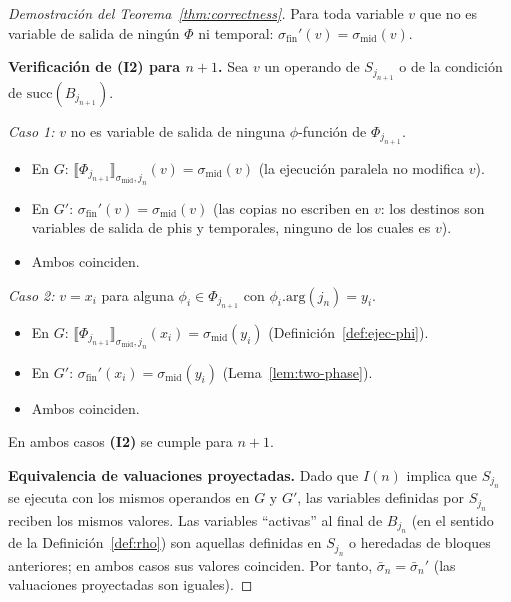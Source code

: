 \documentclass[12pt, a4paper]{article}
\begin{document}
\begin{proof}[Demostración del Teorema~\ref{thm:correctness}]
Para toda variable $v$ que no es variable de salida de ningún $\Phi$ ni temporal:
$\sigma_{\mathrm{fin}}'(v) = \sigma_{\mathrm{mid}}(v)$.

\medskip
%
%
\textbf{Verificación de \textbf{(I2)} para $n+1$.}
Sea $v$ un operando de $S_{j_{n+1}}$ o de la condición de $\mathrm{succ}(B_{j_{n+1}})$.

\emph{Caso 1:} $v$ no es variable de salida de ninguna $\phi$-función de $\Phi_{j_{n+1}}$.
\begin{itemize}
  \item En $G$: $\llbracket \Phi_{j_{n+1}} \rrbracket_{\sigma_{\mathrm{mid}}, j_n}(v)
    = \sigma_{\mathrm{mid}}(v)$ \quad (la ejecución paralela no modifica $v$).
  \item En $G'$: $\sigma_{\mathrm{fin}}'(v) = \sigma_{\mathrm{mid}}(v)$ \quad
    (las copias no escriben en $v$: los destinos son variables de salida de phis y temporales,
    ninguno de los cuales es $v$).
  \item Ambos coinciden. \checkmark
\end{itemize}

\emph{Caso 2:} $v = x_i$ para alguna $\phi_i \in \Phi_{j_{n+1}}$ con
$\phi_i.\mathrm{arg}(j_n) = y_i$.
\begin{itemize}
  \item En $G$: $\llbracket \Phi_{j_{n+1}} \rrbracket_{\sigma_{\mathrm{mid}}, j_n}(x_i)
    = \sigma_{\mathrm{mid}}(y_i)$ \quad (Definición~\ref{def:ejec-phi}).
  \item En $G'$: $\sigma_{\mathrm{fin}}'(x_i) = \sigma_{\mathrm{mid}}(y_i)$ \quad
    (Lema~\ref{lem:two-phase}).
  \item Ambos coinciden. \checkmark
\end{itemize}

\medskip
En ambos casos \textbf{(I2)} se cumple para $n+1$.

\medskip
\textbf{Equivalencia de valuaciones proyectadas.}
Dado que $I(n)$ implica que $S_{j_n}$ se ejecuta con los mismos operandos en $G$ y $G'$,
las variables definidas por $S_{j_n}$ reciben los mismos valores. Las variables ``activas''
al final de $B_{j_n}$ (en el sentido de la Definición~\ref{def:rho}) son aquellas definidas
en $S_{j_n}$ o heredadas de bloques anteriores; en ambos casos sus valores coinciden.
Por tanto, $\bar\sigma_n = \bar\sigma_n'$ (las valuaciones proyectadas son iguales).


\end{proof}
\end{document}

